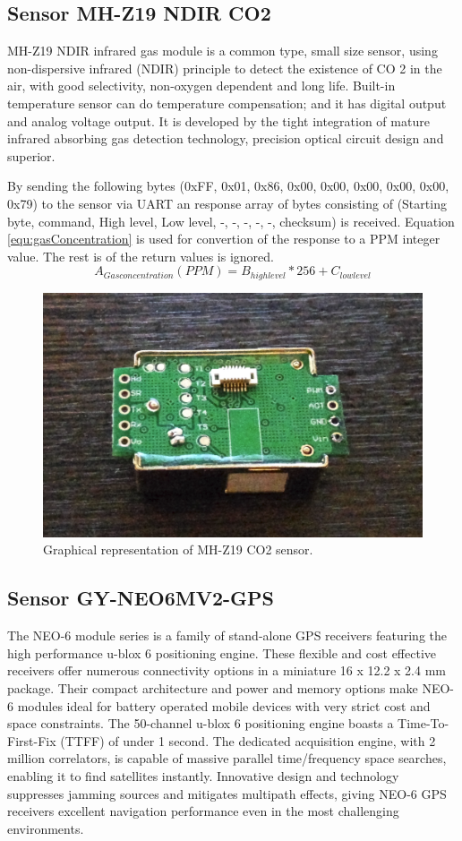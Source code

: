 \subsection{Sensor MH-Z19 NDIR CO2}
MH-Z19 NDIR infrared gas module is a common type, small size sensor, using non-dispersive
infrared (NDIR) principle to detect the existence of CO 2 in the air, with good selectivity, non-oxygen
dependent and long life. Built-in temperature sensor can do temperature compensation; and it has
digital output and analog voltage output. It is developed by the tight integration of mature infrared absorbing
gas detection technology, precision optical circuit design and superior.

By sending the following bytes (0xFF, 0x01, 0x86, 0x00, 0x00, 0x00, 0x00, 0x00, 0x79) to the sensor via UART an response array of bytes consisting of
(Starting byte, command, High level, Low level, -, -, -, -, -, checksum) is received. Equation \ref{equ:gasConcentration} is used for convertion of the response to a PPM integer value.
The rest is of the return values is ignored.
\begin{equation}
  A_{Gas concentration} (PPM) = B_{high level} * 256 + C_{low level}
  \label{equ:gasConcentration}
\end{equation}



\begin{figure}[p]
    \centering
    \includegraphics[width=0.5\linewidth]{MH-Z19}
    \caption{Graphical representation of MH-Z19 CO2 sensor.}
    \label{fig:MH-Z19}
\end{figure}



\subsection{Sensor GY-NEO6MV2-GPS}
The NEO-6 module series is a family of stand-alone GPS receivers featuring the high performance u-blox 6
positioning engine. These flexible and cost effective receivers offer numerous connectivity options in a miniature
16 x 12.2 x 2.4 mm package. Their compact architecture and power and memory options make NEO-6 modules
ideal for battery operated mobile devices with very strict cost and space constraints.
The 50-channel u-blox 6 positioning engine boasts a Time-To-First-Fix (TTFF) of under 1 second. The dedicated
acquisition engine, with 2 million correlators, is capable of massive parallel time/frequency space searches,
enabling it to find satellites instantly. Innovative design and technology suppresses jamming sources and
mitigates multipath effects, giving NEO-6 GPS receivers excellent navigation performance even in the most
challenging environments.

